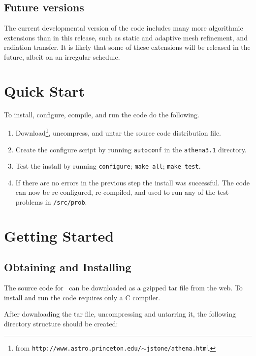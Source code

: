 \subsection{Future versions}

The current developmental version of the code includes many more
algorithmic extensions than in this release, such as static and
adaptive mesh refinement, and radiation transfer.
It is likely that some of these extensions will be released in the future,
albeit on an irregular schedule.

\section{Quick Start}

To install, configure, compile, and run the code do the following.
\begin{enumerate}

\item Download\footnote{from {\tt http://www.astro.princeton.edu/$\sim$jstone/athena.html}}, uncompress, and untar the source code distribution file.

\item Create the configure script by running {\tt autoconf} in the
{\tt athena3.1} directory.

\item Test the install by running {\tt configure}; {\tt make all};
{\tt make test}.

\item If there are no errors in the previous step the install was
successful.  The code can now be re-configured, re-compiled, and used to run any
of the test problems in {\tt /src/prob}.

\end{enumerate}

\section{Getting Started}

\subsection{Obtaining and Installing \ath}

The source code for \ath\ can be downloaded as a gzipped tar file from the
web\footnotemark[2].  To install and run the code requires only a C compiler.

After downloading the tar file, uncompressing and untarring it,
the following directory structure should be created:

